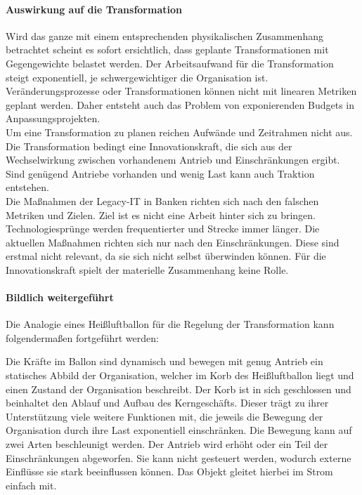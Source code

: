 \paragraph{Auswirkung auf die Transformation}

Wird das ganze mit einem entsprechenden physikalischen Zusammenhang betrachtet scheint es sofort ersichtlich, dass geplante Transformationen mit Gegengewichte belastet werden. Der Arbeitsaufwand für die Transformation steigt exponentiell, je schwergewichtiger die Organisation ist. Veränderungsprozesse oder Transformationen können nicht mit linearen Metriken geplant werden. Daher entsteht auch das Problem von exponierenden Budgets in Anpassungsprojekten.
\medskip
\\
Um eine Transformation zu planen reichen Aufwände und Zeitrahmen nicht aus. Die Transformation bedingt eine Innovationskraft, die sich aus der Wechselwirkung zwischen vorhandenem Antrieb und Einschränkungen ergibt. Sind genügend Antriebe vorhanden und wenig Last kann auch Traktion entstehen.
\medskip
\\
Die Maßnahmen der Legacy-IT in Banken richten sich nach den falschen Metriken und Zielen. Ziel ist es nicht eine Arbeit hinter sich zu bringen. Technologiesprünge werden frequentierter und Strecke immer länger.
Die aktuellen Maßnahmen richten sich nur nach den Einschränkungen. Diese sind erstmal nicht relevant, da sie sich nicht selbst überwinden können. Für die Innovationskraft spielt der materielle Zusammenhang keine Rolle.

\paragraph{Bildlich weitergeführt}
Die Analogie eines Heißluftballon für die Regelung der Transformation kann folgendermaßen fortgeführt werden:

Die Kräfte im Ballon sind dynamisch und bewegen mit genug Antrieb ein statisches Abbild der Organisation, welcher im Korb des Heißluftballon liegt und einen Zustand der Organisation beschreibt. Der Korb ist in sich geschlossen und beinhaltet den Ablauf und Aufbau des Kerngeschäfts. Dieser trägt zu ihrer Unterstützung viele weitere Funktionen mit, die jeweils die Bewegung der Organisation durch ihre Last exponentiell einschränken. Die Bewegung kann auf zwei Arten beschleunigt werden. Der Antrieb wird erhöht oder ein Teil der Einschränkungen abgeworfen. Sie kann nicht gesteuert werden, wodurch externe Einflüsse sie stark beeinflussen können. Das Objekt gleitet hierbei im Strom einfach mit.
\medskip
\\
